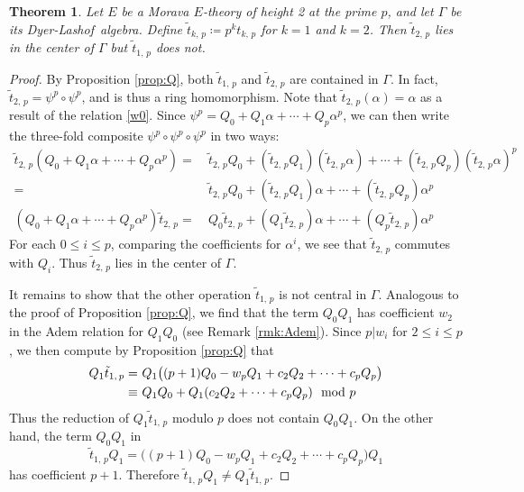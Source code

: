 \documentclass{gtpart}
\newtheorem{thm}{Theorem}
\theoremstyle{definition}
\theoremstyle{remark}
\newcommand{\DL}{Dyer-Lashof~}
\newcommand{\md}{~~{\rm mod}~}
\newcommand{\A}{\alpha}
\newcommand{\G}{\Gamma}
\newcommand{\ce}{\coloneqq}
\renewcommand{\=}{\approx}
\renewcommand{\-}{\sim}
\numberwithin{equation}{section}
\numberwithin{thm}{section}
\begin{document}
\begin{thm}
 \label{thm:center}
 Let $E$ be a Morava $E$-theory of height 2 at the prime $p$, and let $\G$ be its \DL algebra.  
 Define $\tilde{t}_{k,\,p} \ce p^k t_{k,\,p}$ for $k = 1$ and $k = 2$.  
 Then $\tilde{t}_{2,\,p}$ lies in the center of $\G$ but $\tilde{t}_{1,\,p}$ does not.  
\end{thm}
\begin{proof}
 By Proposition \ref{prop:Q}, both $\tilde{t}_{1,\,p}$ and $\tilde{t}_{2,\,p}$ are 
 contained in $\G$.  In fact, $\tilde{t}_{2,\,p} = \psi^p \circ \psi^p$, and is thus a 
 ring homomorphism.  
 Note that $\tilde{t}_{2,\,p}(\A) = \A$ as a result of the relation \eqref{w0}.  Since 
 $\psi^p = Q_0 + Q_1 \A + \cdots + Q_p \A^p$, we can then write the three-fold 
 composite $\psi^p \circ \psi^p \circ \psi^p$ in two ways: 
 \begin{equation*}
  \begin{split}
   \tilde{t}_{2,\,p} (Q_0 + Q_1 \A + \cdots + Q_p \A^p) = & ~ \tilde{t}_{2,\,p} Q_0 + (\tilde{t}_{2,\,p} Q_1) (\tilde{t}_{2,\,p} \A) + \cdots + (\tilde{t}_{2,\,p} Q_p) (\tilde{t}_{2,\,p} \A)^p \\
                                                        = & ~ \tilde{t}_{2,\,p} Q_0 + (\tilde{t}_{2,\,p} Q_1) \A + \cdots + (\tilde{t}_{2,\,p} Q_p) \A^p \\
   (Q_0 + Q_1 \A + \cdots + Q_p \A^p) \tilde{t}_{2,\,p} = & ~  Q_0 \tilde{t}_{2,\,p} + (Q_1 \tilde{t}_{2,\,p}) \A + \cdots + (Q_p \tilde{t}_{2,\,p}) \A^p 
  \end{split}
 \end{equation*}
 For each $0 \leq i \leq p$, comparing the coefficients for $\A^i$, 
 we see that $\tilde{t}_{2,\,p}$ commutes with $Q_i$.  
 Thus $\tilde{t}_{2,\,p}$ lies in the center of $\G$.  

 It remains to show that the other operation $\tilde{t}_{1,\,p}$ is not central in 
 $\G$.  Analogous to the proof of Proposition \ref{prop:Q}, we find that the term 
 $Q_0 Q_1$ has coefficient $w_2$ in the Adem relation for $Q_1 Q_0$ (see Remark 
 \ref{rmk:Adem}).  Since $p | w_i$ for $2 \leq i \leq p$, we then compute by Proposition \ref{prop:Q} that 
 \begin{equation*}
  \begin{split}
   Q_1 \tilde{t}_{1,\,p} = & ~ Q_1 \big( (p + 1) Q_0 - w_p Q_1 + c_2 Q_2 + \cdots + c_p Q_p \big) \\
                    \equiv & ~ Q_1 Q_0 + Q_1 (c_2 Q_2 + \cdots + c_p Q_p) \md p 
  \end{split}
 \end{equation*}
 Thus the reduction of $Q_1 \tilde{t}_{1,\,p}$ modulo $p$ does not contain $Q_0 Q_1$.  
 On the other hand, the term $Q_0 Q_1$ in 
 \[
  \tilde{t}_{1,\,p} Q_1 = \big( (p + 1) Q_0 - w_p Q_1 + c_2 Q_2 + \cdots + c_p Q_p \big) Q_1 
 \]
 has coefficient $p + 1$.  
 Therefore $\tilde{t}_{1,\,p} Q_1 \neq Q_1 \tilde{t}_{1,\,p}$.  
\end{proof}
\end{document}
